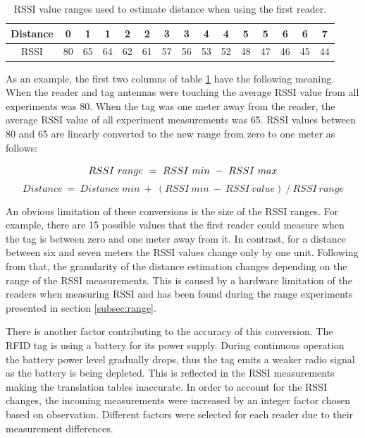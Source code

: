 \begin{table}[h]
	\centering
	\begin{tabular}{ | c | c | c || c | c || c | c || c | c || c | c || c | c || c | c | }
		\hline
		Distance 	& 0  & 1  & 1  & 2  & 2  & 3  & 3  & 4  & 4  & 5  & 5  & 6  & 6  & 7  \\ \hline
		RSSI 		& 80 & 65 & 64 & 62 & 61 & 57 & 56 & 53 & 52 & 48 & 47 & 46 & 45 & 44  \\ \hline
	\end{tabular}
	\caption{RSSI value ranges used to estimate distance when using the first reader.}
	\label{tbl:trans}
\end{table}

As an example, the first two columns of table \ref{tbl:trans} have the following meaning. When the reader and tag antennas were touching the average RSSI value from all experiments was 80. When the tag was one meter away from the reader, the average RSSI value of all experiment measurements was 65. RSSI values between 80 and 65 are linearly converted to the new range from zero to one meter as follows:

\[RSSI \ range \ = \ RSSI \ min \ - \ RSSI \ max \\\]
\[Distance \ = \ Distance \ min \ + \ (RSSI \ min \ - \ RSSI \ value) \ / \ RSSI \ range\]

An obvious limitation of these conversions is the size of the RSSI ranges. For example, there are 15 possible values that the first reader could measure when the tag is between zero and one meter away from it. In contrast, for a distance between six and seven meters the RSSI values change only by one unit. Following from that, the granularity of the distance estimation changes depending on the range of the RSSI measurements. This is caused by a hardware limitation of the readers when measuring RSSI and has been found during the range experiments presented in section \ref{subsec:range}.

There is another factor contributing to the accuracy of this conversion. The RFID tag is using a battery for its power supply. During continuous operation the battery power level gradually drops, thus the tag emits a weaker radio signal as the battery is being depleted. This is reflected in the RSSI measurements making the translation tables inaccurate. In order to account for the RSSI changes, the incoming measurements were increased by an integer factor chosen based on observation. Different factors were selected for each reader due to their measurement differences.

